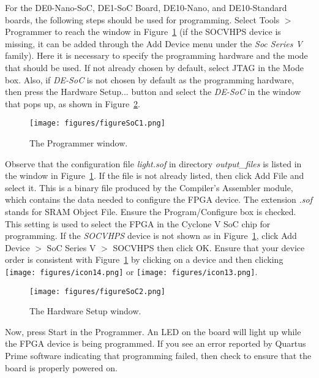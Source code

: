 For the DE0-Nano-SoC, DE1-SoC Board, DE10-Nano, and DE10-Standard boards, the following steps should be used for programming.
Select {\sf Tools $>$ Programmer} to reach the window in Figure~\ref{fig:SoC1} (if the SOCVHPS device is missing, it can be added through the {\sf Add Device} menu under the \textit{Soc Series V} family).
Here it is necessary to specify the programming hardware and 
the mode that should be used. If not already chosen by default, 
select JTAG in the Mode box.  Also, if {\it DE-SoC} is not chosen by default as the programming
hardware, then press the {\sf Hardware Setup...} button and select the {\it DE-SoC} in the 
window that pops up, as shown in Figure~\ref{fig:SoC2}.

\begin{figure}[H]
   \begin{center}
      \texttt{[image: figures/figureSoC1.png]}
   \caption{The Programmer window.} 
	 \label{fig:SoC1}
	 \end{center}
\end{figure}

Observe that the configuration file {\it light.sof} in directory {\it output\_files} is listed in the window in
Figure~\ref{fig:SoC1}. If the file is not already listed, then click {\sf Add File} 
and select it.
This is a binary file produced by the Compiler's Assembler module, 
which contains the data needed to configure the FPGA device.
The extension {\it .sof} stands for SRAM Object File.
Ensure the {\sf Program/Configure} box is checked.
This setting is used to select the FPGA in the Cyclone V SoC chip for programming.
If the {\it SOCVHPS} device is not shown as in Figure~\ref{fig:SoC1}, click {\sf Add Device $>$ SoC Series V $>$ SOCVHPS} then click {\sf OK}.
Ensure that your device order is consistent with Figure~\ref{fig:SoC1} by clicking on a device and then clicking \texttt{[image: figures/icon14.png]} or \texttt{[image: figures/icon13.png]}.

\begin{figure}[H]
   \begin{center}
      \texttt{[image: figures/figureSoC2.png]}
   \caption{The Hardware Setup window.} 
	 \label{fig:SoC2}
	 \end{center}
\end{figure}

Now, press {\sf Start} in the Programmer.  An LED on the board will light up 
while the FPGA device is being programmed. 
If you see an error reported by Quartus Prime software indicating that
programming failed, then check to ensure that the board is properly powered on.

